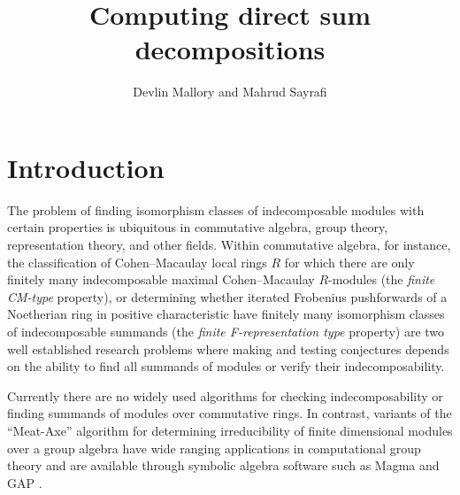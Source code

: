 \documentclass{article}
\title{Computing direct sum decompositions}
\author{Devlin Mallory and Mahrud Sayrafi}
\numberwithin{equation}{section}
\theoremstyle{theorem}
\numberwithin{thm}{section}
\theoremstyle{definition}
\begin{document}
\maketitle



\section{Introduction}


The problem of finding isomorphism classes of indecomposable modules with certain properties is ubiquitous in commutative algebra, group theory, representation theory, and other fields. Within commutative algebra, for instance, the classification of Cohen--Macaulay local rings $R$ for which there are only finitely many indecomposable maximal Cohen--Macaulay $R$-modules (the \emph{finite CM-type} property), or determining whether iterated Frobenius pushforwards of a Noetherian ring in positive characteristic have finitely many isomorphism classes of indecomposable summands (the \emph{finite F-representation type} property) are two well established research problems where making and testing conjectures depends on the ability to find all summands of modules or verify their indecomposability.

Currently there are no widely used algorithms for checking indecomposability or finding summands of modules over commutative rings. In contrast, variants of the ``Meat-Axe'' algorithm for determining irreducibility of finite dimensional modules over a group algebra have wide ranging applications in computational group theory \cite{Parker84,HR94,Holt98} and are available through symbolic algebra software such as Magma and GAP \cite{MAGMA,GAP}.
\end{document}
